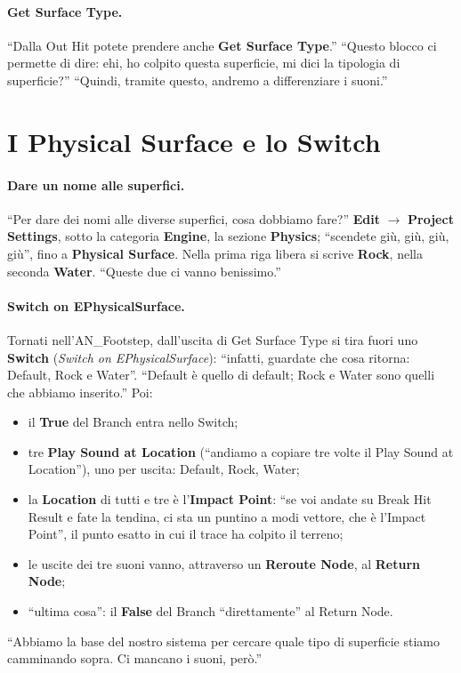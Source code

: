 \paragraph{Get Surface Type.} ``Dalla Out Hit potete prendere anche \textbf{Get Surface
Type}.'' ``Questo blocco ci permette di dire: ehi, ho colpito questa superficie, mi dici la
tipologia di superficie?'' ``Quindi, tramite questo, andremo a differenziare i suoni.''

\section{I Physical Surface e lo Switch}
\label{ue10:sec:surface}

\paragraph{Dare un nome alle superfici.} ``Per dare dei nomi alle diverse superfici, cosa
dobbiamo fare?'' \textbf{Edit} $\rightarrow$ \textbf{Project Settings}, sotto la categoria
\textbf{Engine}, la sezione \textbf{Physics}; ``scendete giù, giù, giù, giù'', fino a
\textbf{Physical Surface}. Nella prima riga libera si scrive \textbf{Rock}, nella seconda
\textbf{Water}. ``Queste due ci vanno benissimo.''

\paragraph{Switch on EPhysicalSurface.} Tornati nell'AN\_Footstep, dall'uscita di Get
Surface Type si tira fuori uno \textbf{Switch} (\emph{Switch on EPhysicalSurface}):
``infatti, guardate che cosa ritorna: Default, Rock e Water''. ``Default è quello di
default; Rock e Water sono quelli che abbiamo inserito.'' Poi:
\begin{itemize}
  \item il \textbf{True} del Branch entra nello Switch;
  \item tre \textbf{Play Sound at Location} (``andiamo a copiare tre volte il Play Sound
        at Location''), uno per uscita: Default, Rock, Water;
  \item la \textbf{Location} di tutti e tre è l'\textbf{Impact Point}: ``se voi andate su
        Break Hit Result e fate la tendina, ci sta un puntino a modi vettore, che è
        l'Impact Point'', il punto esatto in cui il trace ha colpito il terreno;
  \item le uscite dei tre suoni vanno, attraverso un \textbf{Reroute Node}, al
        \textbf{Return Node};
  \item ``ultima cosa'': il \textbf{False} del Branch ``direttamente'' al Return Node.
\end{itemize}
``Abbiamo la base del nostro sistema per cercare quale tipo di superficie stiamo
camminando sopra. Ci mancano i suoni, però.''

